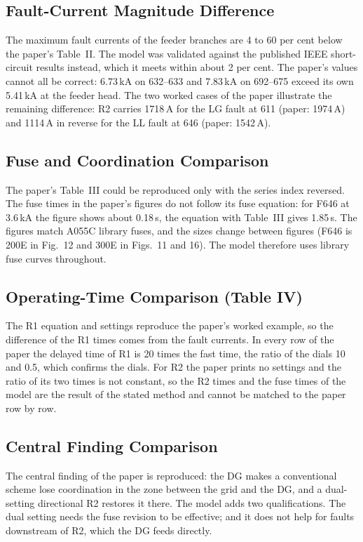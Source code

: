 \documentclass[12pt,a4paper]{article}
\begin{document}
\subsection*{Fault-Current Magnitude Difference}
The maximum fault currents of the feeder branches are 4 to 60 per cent below the paper's Table~II. The model was validated against the
published IEEE short-circuit results instead, which it meets within about 2 per cent. The paper's values cannot
all be correct: 6.73\,kA on 632--633 and 7.83\,kA on 692--675 exceed its own 5.41\,kA at the feeder head. The
two worked cases of the paper illustrate the remaining difference: R2 carries 1718\,A for the LG fault at
611 (paper: 1974\,A) and 1114\,A in reverse for the LL fault at 646 (paper: 1542\,A).

\subsection*{Fuse and Coordination Comparison}
The paper's Table~III could be reproduced only with the series index reversed. The fuse times in the paper's
figures do not follow its fuse equation: for F646 at 3.6\,kA the figure shows about 0.18\,s, the equation
with Table~III gives 1.85\,s. The figures match A055C library fuses, and the sizes change between figures
(F646 is 200E in Fig.~12 and 300E in Figs.~11 and 16). The model therefore uses library fuse curves
throughout.

\subsection*{Operating-Time Comparison (Table IV)}
The R1 equation and settings reproduce the paper's worked example, so the difference of the R1 times comes
from the fault currents. In every row of the paper the delayed time of R1 is 20 times the fast time, the
ratio of the dials 10 and 0.5, which confirms the dials. For R2 the paper prints no settings and the ratio of
its two times is not constant, so the R2 times and the fuse times of the model are the result of the stated
method and cannot be matched to the paper row by row.

\subsection*{Central Finding Comparison}
The central finding of the paper is reproduced: the DG makes a conventional scheme lose coordination in the
zone between the grid and the DG, and a dual-setting directional R2 restores it there. The model adds two
qualifications. The dual setting needs the fuse revision to be effective; and it does not help for faults
downstream of R2, which the DG feeds directly.
\end{document}
